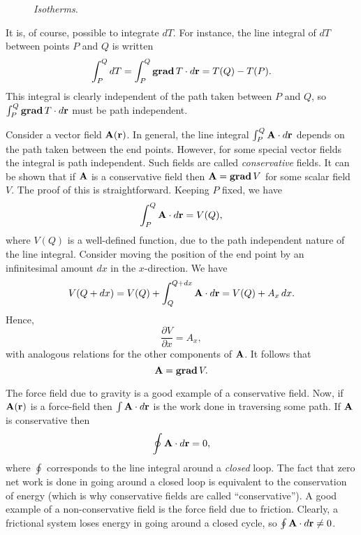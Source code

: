 \begin{figure}
\centerline{}
\caption{\em Isotherms.}\label{f16}
\end{figure}

It is, of course, possible to integrate $dT$. For instance, the line integral of $dT$ between points $P$ and
$Q$ is written
\begin{equation}
\int_P^Q dT = \int_P^Q {\bf grad}\,T\cdot d{\bf r} = T(Q)-T(P).
\end{equation}
This integral is clearly independent of the path taken between $P$ and $Q$, so
$\int_P^Q {\bf grad }\,T\cdot d{\bf r}$ must be path independent. 


Consider a vector field ${\bf A}({\bf r})$. In general, the line integral $\int_P^Q {\bf A}\cdot d{\bf r}$ depends on the path
taken between the end points. However, for some special vector fields the integral is path independent. Such fields
are called {\em conservative}\/ fields. It can be shown that if ${\bf A}$ is a
conservative field then ${\bf A} = {\bf grad}\,V$ for some scalar field $V$.
The proof of this is straightforward. Keeping $P$ fixed, we have
\begin{equation}
\int_P^Q {\bf A}\cdot d{\bf r} = V(Q),
\end{equation}
where $V(Q)$ is a well-defined function, due to the path independent nature of the
line integral. Consider moving the position of the end point by an infinitesimal
amount $dx$ in the $x$-direction. We have
\begin{equation}
V(Q+dx) = V(Q) + \int_Q^{Q+dx} {\bf A}\cdot d{\bf r} = V(Q) + A_x\,dx.
\end{equation}
Hence,
\begin{equation}
\frac{\partial V}{\partial x} = A_x,
\end{equation}
with analogous relations for the other components of ${\bf A}$. It follows that
\begin{equation}
{\bf A} = {\bf grad} \,V.
\end{equation}

The force field due to gravity is a good example of a conservative field.
Now, if ${\bf A}({\bf r})$ is a force-field then  $\int {\bf A}\cdot d{\bf r}$ is the work done
in traversing some path. If ${\bf A}$ is conservative then
\begin{equation}
\oint {\bf A}\cdot d{\bf r} = 0,
\end{equation}
where $\oint$ corresponds to the line integral around a {\em closed}\/ loop. 
The fact that zero net work is done in going around a closed loop is equivalent
to the conservation of energy (which is why conservative fields are called
``conservative''). A good example of a non-conservative field is the force field due
to friction. Clearly, a frictional system loses energy in going around a closed
cycle, so $\oint {\bf A}\cdot d{\bf r} \neq 0$. 

